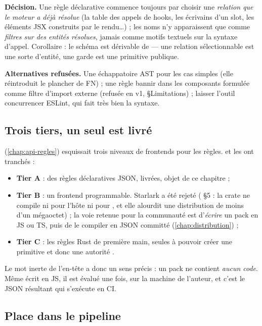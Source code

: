 \begin{decision}
\textbf{Décision.} Une règle déclarative commence toujours par choisir une \emph{relation que le moteur a déjà résolue} (la table des appels de hooks, les écrivains d'un slot, les éléments JSX construits par le rendu\ldots) ; les noms n'y apparaissent que comme \emph{filtres sur des entités résolues}, jamais comme motifs textuels sur la syntaxe d'appel. Corollaire : le schéma est dérivable de  --- une relation sélectionnable est une sorte d'entité, une garde est une primitive publique.

\textbf{Alternatives refusées.} Une échappatoire AST \og pour les cas simples\fg{} (elle réintroduit le plancher de FN) ; une règle \og bannir  dans les composants\fg{} formulée comme filtre d'import externe (refusée en v1,  §Limitations) ; laisser l'outil concurrencer ESLint, qui fait très bien la syntaxe.
\end{decision}

\subsection{Trois tiers, un seul est livré}

 (\cref{chap:api-regles}) esquissait trois niveaux de frontends pour les règles.  et  les ont tranchés :
\begin{itemize}
  \item \textbf{Tier A} : des règles déclaratives JSON, livrées, objet de ce chapitre ;
  \item \textbf{Tier B} : un frontend programmable. Starlark a été rejeté ( §5 : la crate ne compile ni pour l'hôte ni pour , et elle alourdit une distribution de moins d'un mégaoctet) ; la voie retenue pour la communauté est d'\emph{écrire} un pack en JS ou TS, puis de le compiler en JSON committé (\cref{chap:distribution}) ;
  \item \textbf{Tier C} : les règles Rust de première main, seules à pouvoir créer une primitive et donc une autorité \Error{}.
\end{itemize}
Le mot \og inerte\fg{} de l'en-tête a donc un sens précis : un pack ne contient \emph{aucun code}. Même écrit en JS, il est évalué une fois, sur la machine de l'auteur, et c'est le JSON résultant qui s'exécute en CI.

\subsection{Place dans le pipeline}

